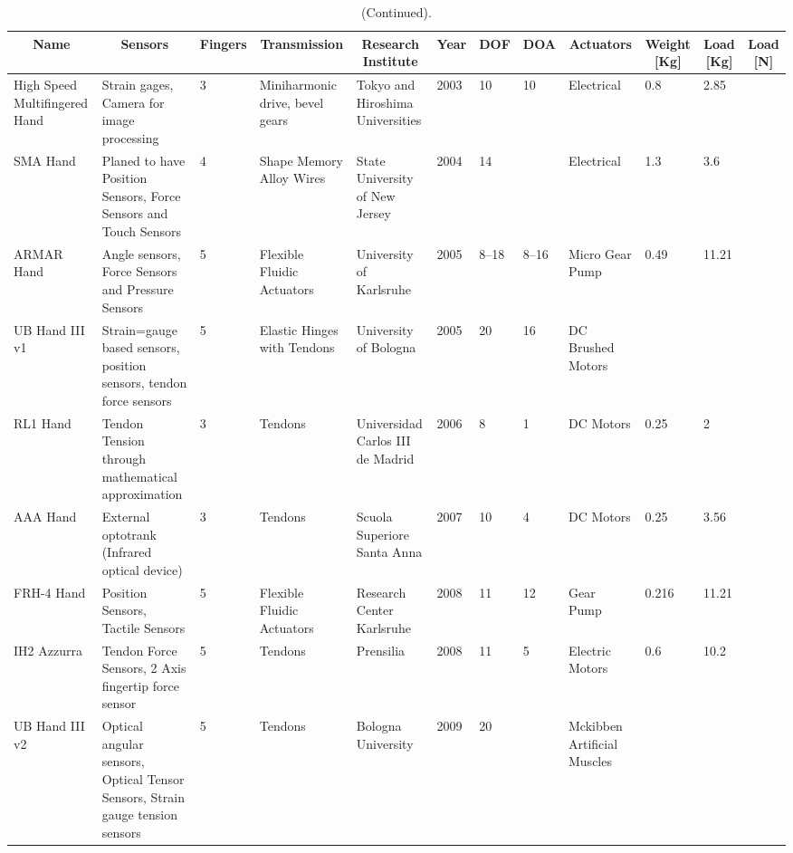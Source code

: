 \documentclass[a4paper, 10pt, conference]{ieeeconf}      %
\begin{document}
\begin{landscape}
\begin{table}[]
\centering
\caption{(Continued).}
\label{my-label}
\begin{tabular}{p{2cm}p{4cm}lp{2cm}p{2cm}lllp{2cm}lll}
\hline
\multicolumn{1}{c}{\textbf{Name}} & \multicolumn{1}{c}{\textbf{Sensors}} & \multicolumn{1}{c}{\textbf{Fingers}} & \multicolumn{1}{c}{\textbf{Transmission}} & \multicolumn{1}{c}{\textbf{Research Institute}} & \multicolumn{1}{c}{\textbf{Year}} & \multicolumn{1}{c}{\textbf{DOF}} & \multicolumn{1}{c}{\textbf{DOA}} & \multicolumn{1}{c}{\textbf{Actuators}} & \multicolumn{1}{c}{\textbf{Weight {[}Kg{]}}} & \multicolumn{1}{c}{\textbf{Load {[}Kg{]}}} & \multicolumn{1}{c}{\textbf{Load {[}N{]}}} \\ \hline
High Speed Multifingered Hand & Strain gages, Camera for image processing & 3 & Miniharmonic drive, bevel gears & Tokyo and Hiroshima Universities & 2003 & 10 & 10 & Electrical & 0.8 & 2.85 &  \\ \hline
SMA Hand & Planed to have Position Sensors, Force Sensors and Touch Sensors & 4 & Shape Memory Alloy Wires & State University of New Jersey & 2004 & 14 &  & Electrical & 1.3 & 3.6 &  \\ \hline
ARMAR Hand & Angle sensors, Force Sensors and Pressure Sensors & 5 & Flexible Fluidic Actuators & University of Karlsruhe & 2005 & 8–18 & 8–16 & Micro Gear Pump & 0.49 & 11.21 &  \\ \hline
UB Hand III v1 & Strain=gauge based sensors, position sensors, tendon force sensors & 5 & Elastic Hinges with Tendons & University of Bologna & 2005 & 20 & 16 & DC Brushed Motors &  &  &  \\ \hline
RL1 Hand & Tendon Tension through mathematical approximation & 3 & Tendons & Universidad Carlos III de Madrid & 2006 & 8 & 1 & DC Motors & 0.25 & 2 &  \\ \hline
AAA Hand & External optotrank (Infrared optical device) & 3 & Tendons & Scuola Superiore Santa Anna & 2007 & 10 & 4 & DC Motors & 0.25 & 3.56 &  \\ \hline
FRH-4 Hand & Position Sensors, Tactile Sensors & 5 & Flexible Fluidic Actuators & Research Center Karlsruhe & 2008 & 11 & 12 & Gear Pump & 0.216 & 11.21 &  \\ \hline
IH2 Azzurra & Tendon Force Sensors, 2 Axis fingertip force sensor & 5 & Tendons & Prensilia & 2008 & 11 & 5 & Electric Motors & 0.6 & 10.2 &  \\ \hline
UB Hand III v2 & Optical angular sensors, Optical Tensor Sensors, Strain gauge tension sensors & 5 & Tendons & Bologna University & 2009 & 20 &  & Mckibben Artificial Muscles &  &  &  \\ \hline

\end{tabular}
\end{table}
\end{landscape}
\end{document}
